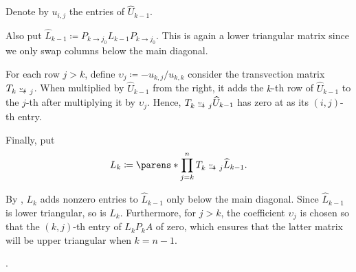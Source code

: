 \begin{algorithm}
\begin{thmenum}
    Denote by \( u_{i,j} \) the entries of \( \widehat{U}_{k-1} \).

    Also put \( \widehat{L}_{k-1} \coloneqq P_{k \to j_0} L_{k-1} P_{k \to j_0} \). This is again a lower triangular matrix since we only swap columns below the main diagonal.

    For each row \( j > k \), define \( \upsilon_j \coloneqq - u_{k,j} / u_{k,k} \) consider the transvection matrix \( T_{k \reloset {\upsilon_j} \to j} \). When multiplied by \( \widehat{U}_{k-1} \) from the right, it adds the \( k \)-th row of \( \widehat{U}_{k-1} \) to the \( j \)-th after multiplying it by \( \upsilon_j \). Hence, \( T_{k \reloset {\upsilon_j} \to j} \widehat{U}_{k-1} \) has zero at as its \( (i, j) \)-th entry.

    Finally, put
    \begin{equation*}
      L_k \coloneqq \parens*{ \prod_{j=k}^n T_{k \reloset {\upsilon_j} \to j} } \widehat{L}_{k-1}.
    \end{equation*}

    By , \( L_k \) adds nonzero entries to \( \widehat{L}_{k-1} \) only below the main diagonal. Since \( \widehat{L}_{k-1} \) is lower triangular, so is \( L_k \). Furthermore, for \( j > k \), the coefficient \( \upsilon_j \) is chosen so that the \( (k, j) \)-th entry of \( L_k P_k A \) of zero, which ensures that the latter matrix will be upper triangular when \( k = n - 1 \).
  \end{thmenum}
\end{algorithm}
\begin{comments}
  \item {}
  \item {}
  \item {}.
\end{comments}

